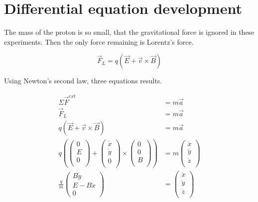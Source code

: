 \documentclass[a4paper,12pt,twoside]{article}
\begin{document}
\section{Differential equation development} \label{ann:dev-eq-diff}
The mass of the proton is so small, that the gravitational force is ignored in these experiments.
Then the only force remaining is Lorentz's force.

\begin{equation*}
	\vec{F}_L = q(\vec{E} + \vec{v}\times\vec{B})
	\label{eq:lorentz-force}
\end{equation*}

Using Newton's second law, three equations results.

\begin{align*}
	\Sigma\vec{F}^{ext} &= m\vec{a} \\
	\vec{F}_L &= m\vec{a}\\
	q(\vec{E} + \vec{v}\times\vec{B}) &= m\vec{a} \\
	q\left( \begin{pmatrix} 0\\ E\\ 0\\ \end{pmatrix} + \begin{pmatrix} \dot{x}\\ \dot{y}\\ 0\\ \end{pmatrix} \times \begin{pmatrix} 0\\ 0\\ B\\ \end{pmatrix}\right) &= m\begin{pmatrix} \ddot{x}\\ \ddot{y}\\ \ddot{z}\\ \end{pmatrix} \\
	\frac{q}{m}\begin{pmatrix} B\dot{y}\\ E - B\dot{x}\\ 0 \end{pmatrix} &= \begin{pmatrix} \ddot{x}\\ \ddot{y}\\ \ddot{z}\\ \end{pmatrix}
\end{align*}
\end{document}
